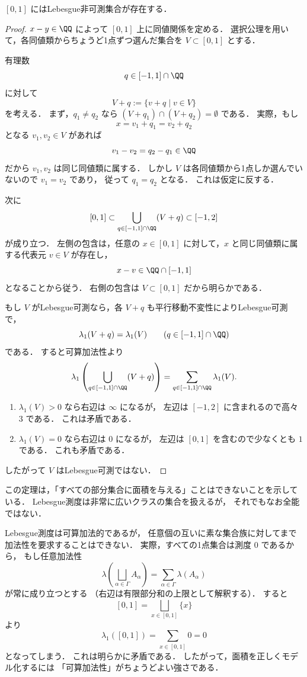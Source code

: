 \begin{theorem}[Vitali]
$[0,1]$ にはLebesgue非可測集合が存在する．
\end{theorem}
\begin{proof}
$x-y \in \QQ$ によって $[0,1]$ 上に同値関係を定める．
選択公理を用いて，各同値類からちょうど1点ずつ選んだ集合を $V \subset [0,1]$ とする．

有理数
\[
q\in [-1,1]\cap\QQ
\]
に対して
\[
V+q:=\{v+q\mid v\in V\}
\]
を考える．
まず，$q_1\ne q_2$ なら $(V+q_1)\cap(V+q_2)=\emptyset$ である．
実際，もし
\[
x=v_1+q_1=v_2+q_2
\]
となる $v_1,v_2\in V$ があれば
\[
v_1-v_2=q_2-q_1\in\QQ
\]
だから $v_1,v_2$ は同じ同値類に属する．
しかし $V$ は各同値類から1点しか選んでいないので $v_1=v_2$ であり，
従って $q_1=q_2$ となる．
これは仮定に反する．

次に
\[
[0,1]\subset \bigcup_{q\in[-1,1]\cap\QQ}(V+q)\subset [-1,2]
\]
が成り立つ．
左側の包含は，任意の $x\in[0,1]$ に対して，$x$ と同じ同値類に属する代表元 $v\in V$ が存在し，
\[
x-v\in\QQ\cap[-1,1]
\]
となることから従う．
右側の包含は $V\subset [0,1]$ だから明らかである．

もし $V$ がLebesgue可測なら，各 $V+q$ も平行移動不変性によりLebesgue可測で，
\[
\lambda_1(V+q)=\lambda_1(V)
\qquad
(q\in[-1,1]\cap\QQ)
\]
である．
すると可算加法性より
\[
\lambda_1\left(\bigcup_{q\in[-1,1]\cap\QQ}(V+q)\right)
=
\sum_{q\in[-1,1]\cap\QQ}\lambda_1(V).
\]

\begin{enumerate}
    \item $\lambda_1(V)>0$ なら右辺は $\infty$ になるが，
    左辺は $[-1,2]$ に含まれるので高々 $3$ である．
    これは矛盾である．
    \item $\lambda_1(V)=0$ なら右辺は $0$ になるが，
    左辺は $[0,1]$ を含むので少なくとも $1$ である．
    これも矛盾である．
\end{enumerate}

したがって $V$ はLebesgue可測ではない．
\end{proof}

\begin{remark}
この定理は，「すべての部分集合に面積を与える」ことはできないことを示している．
Lebesgue測度は非常に広いクラスの集合を扱えるが，
それでもなお全能ではない．
\end{remark}

\begin{remark}[任意加法性は強すぎる]
Lebesgue測度は可算加法的であるが，
任意個の互いに素な集合族に対してまで加法性を要求することはできない．
実際，すべての1点集合は測度 $0$ であるから，
もし任意加法性
\[
\lambda\left(\bigsqcup_{\alpha \in \Gamma} A_\alpha\right)
=
\sum_{\alpha \in \Gamma} \lambda(A_\alpha)
\]
が常に成り立つとする
（右辺は有限部分和の上限として解釈する）．
すると
\[
[0,1] = \bigsqcup_{x \in [0,1]} \{x\}
\]
より
\[
\lambda_1([0,1]) = \sum_{x \in [0,1]} 0 = 0
\]
となってしまう．
これは明らかに矛盾である．
したがって，面積を正しくモデル化するには
「可算加法性」がちょうどよい強さである．
\end{remark}

